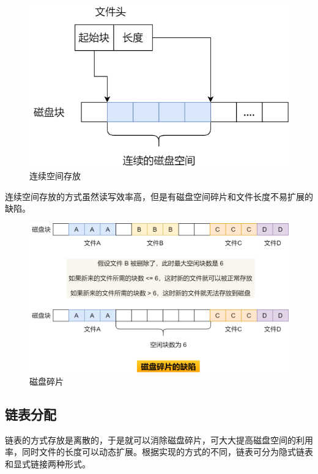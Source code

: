\begin{figure}[H]
    \centering
    \includegraphics[scale=0.5]{img/C5/5-4/1.png}
    \caption{连续空间存放}
\end{figure}

连续空间存放的方式虽然读写效率高，但是有磁盘空间碎片和文件长度不易扩展的缺陷。

\begin{figure}[H]
    \centering
    \includegraphics[scale=0.4]{img/C5/5-4/2.png}
    \caption{磁盘碎片}
\end{figure}

\vspace{0.5cm}

\subsection{链表分配}

链表的方式存放是离散的，于是就可以消除磁盘碎片，可大大提高磁盘空间的利用率，同时文件的长度可以动态扩展。根据实现的方式的不同，链表可分为隐式链表和显式链接两种形式。\\

